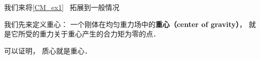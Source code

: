 
\begin{issues}
\issueDraft
\end{issues}


我们来将\autoref{CM_ex1}~ 拓展到一般情况

我们先来定义重心： 一个刚体在均匀重力场中的\textbf{重心（center of gravity）}， 就是它所受的重力关于重心产生的合力矩为零的点．

可以证明， 质心就是重心．

